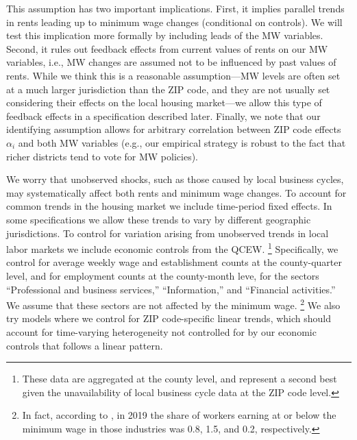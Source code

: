 This assumption has two important implications.
First,
it implies parallel trends in rents leading up to minimum wage changes 
(conditional on controls). We will test this implication more formally by 
including leads of the MW variables.
Second,
it rules out feedback effects from current values of rents on our MW variables, 
i.e., MW changes are assumed not to be influenced by past values of rents.
While we think this is a reasonable assumption---MW levels are often set at a 
much larger jurisdiction than the ZIP code, and they are not usually
set considering their effects on the local housing market---we allow this type 
of feedback effects in a specification described later.
Finally, we note that our identifying assumption allows for arbitrary 
correlation between ZIP code effects $\alpha_i$ and both MW variables
(e.g., our empirical strategy is robust to the fact that richer districts tend 
to vote for MW policies).

We worry that unobserved shocks, such as those caused by local business cycles, 
may systematically affect both rents and minimum wage changes.
To account for common trends in the housing market we include time-period 
fixed effects.
In some specifications we allow these trends to vary by different geographic 
jurisdictions.
To control for variation arising from unobserved trends in local labor markets 
we include economic controls from the QCEW.%
\footnote{These data are aggregated at the county level, and represent a second 
best given the unavailability of local business cycle data at the ZIP code 
level.}
Specifically, we control for average weekly wage and establishment counts at the 
county-quarter level, and for employment counts at the county-month leve, 
for the sectors 
``Professional and business services,'' ``Information,'' and 
``Financial activities.''
We assume that these sectors are not affected by the minimum wage.%
\footnote{In fact, according to \textcite[][Table 5]{MinWorkersReportBLS}, in 
2019 the share of workers earning at or below the minimum wage in those 
industries was 0.8, 1.5, and 0.2, respectively.}
We also try models where we control for ZIP code-specific linear
trends, which should account for time-varying heterogeneity not controlled for 
by our economic controls that follows a linear pattern.

